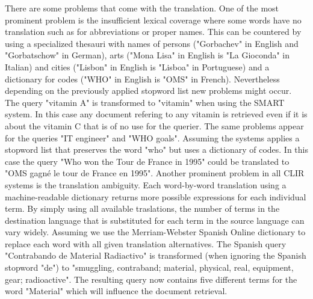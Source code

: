 \documentclass[journal]{IEEEtran}
\begin{document}
There are some problems that come with the translation.
One of the most prominent problem is the insufficient lexical coverage where some words have no translation such as for abbreviations or proper names.
This can be countered by using a specialized thesauri with names of persons ("Gorbachev" in English and "Gorbatschow" in German), arts ("Mona Lisa" in English is "La Gioconda" in Italian) and cities ("Lisbon" in English is "Lisboa" in Portuguese) and a dictionary for codes ("WHO" in English is "OMS" in French).
Nevertheless depending on the previously applied stopword list new problems might occur.
The query "vitamin A" is transformed to "vitamin" when using the SMART system.
In this case any document refering to any vitamin is retrieved even if it is about the vitamin C that is of no use for the querier.
The same problems appear for the queries "IT engineer" and "WHO goals".
Assuming the systems applies a stopword list that preserves the word "who" but uses a dictionary of codes.
In this case the query "Who won the Tour de France in 1995" could be translated to "OMS gagn\'{e} le tour de France en 1995".
Another prominent problem in all CLIR systems is the translation ambiguity.
Each word-by-word translation using a machine-readable dictionary returns more possible expressions for each individual term.
By simply using all available traslations, the number of terms in the destination language that is substituted for each term in the source language can vary widely.
Assuming we use the Merriam-Webster Spanish Online dictionary to replace each word with all given translation alternatives.
The Spanish query "Contrabando de Material Radiactivo" is transformed (when ignoring the Spanish stopword "de") to "smuggling, contraband; material, physical, real, equipment, gear; radioactive".
The resulting query now contains five different terms for the word "Material" which will influence the document retrieval.

\end{document}
